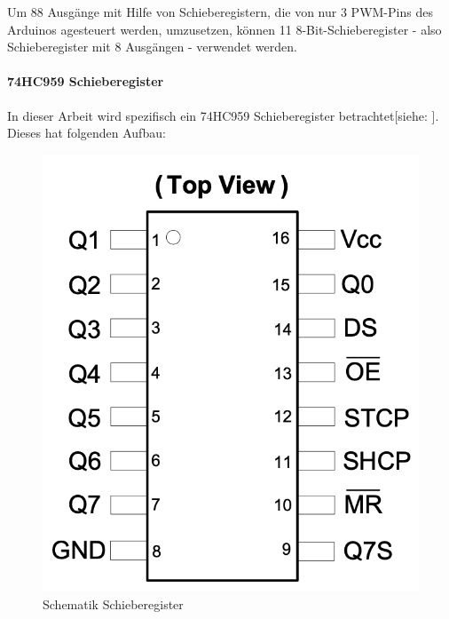 Um 88 Ausgänge mit Hilfe von Schieberegistern, die von nur 3 \ac{PWM}-Pins des Arduinos agesteuert werden, umzusetzen,
können 11 8-Bit-Schieberegister  - also Schieberegister mit 8 Ausgängen - verwendet werden.

\paragraph{74HC959 Schieberegister}
In dieser Arbeit wird spezifisch ein 74HC959 Schieberegister betrachtet[siehe: \cite*[siehe ][]{DatasheetSchieberegister74HC595}].
Dieses hat folgenden Aufbau:
\begin{figure}[htbp]
\begin{minipage}{0.4\textwidth}

		\includegraphics [width=1\textwidth] {img/Schieberegister}
		\caption{Schematik Schieberegister}
		\label{img:Shift}


\end{minipage}
\end{figure}
